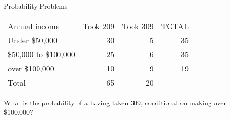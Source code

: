 \documentclass[presentation]{beamer}
\begin{document}
\begin{frame}[label={sec:orgf01a17c}]{Probability Problems}
\begin{center}
\begin{tabular}{lrrr}
Annual income & Took 209 & Took 309 & TOTAL\\
Under \$50,000 & 30 & 5 & 35\\
\$50,000 to \$100,000 & 25 & 6 & 35\\
over \$100,000 & 10 & 9 & 19\\
Total & 65 & 20 & \\
\end{tabular}
\end{center}


What is the probability of a having taken 309, conditional on  making over \$100,000?
\end{frame}
\end{document}
